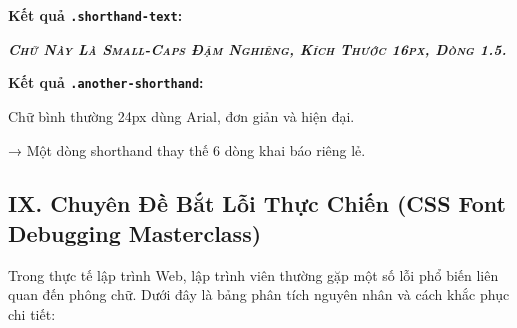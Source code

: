 \documentclass[11pt,oneside]{book}
\newcommand{\codeinline}[1]{\textcolor{accentOrange}{\texttt{#1}}}
\begin{document}
\begin{browserWindow}
\begin{tcolorbox}[arc=4pt, colback=white, colframe=primaryBlue!30, boxrule=0.8pt, top=10pt, bottom=10pt, left=12pt, right=12pt]
  {\sffamily\bfseries\color{primaryBlue} Kết quả \codeinline{.shorthand-text}:}\par\vspace{4pt}
  {\rmfamily\itshape\bfseries\fontsize{13}{20}\selectfont\textsc{Chữ Này Là Small-Caps Đậm Nghiêng, Kích Thước 16px, Dòng 1.5.}}\par\vspace{8pt}
  {\sffamily\bfseries\color{primaryBlue} Kết quả \codeinline{.another-shorthand}:}\par\vspace{4pt}
  {\sffamily\fontsize{16}{20}\selectfont Chữ bình thường 24px dùng Arial, đơn giản và hiện đại.}\par\vspace{4pt}
  {\sffamily\small\color{gray!70} → Một dòng shorthand thay thế 6 dòng khai báo riêng lẻ.}
\end{tcolorbox}
\end{browserWindow}


\subsection*{IX. Chuyên Đề Bắt Lỗi Thực Chiến (CSS Font Debugging Masterclass)}

Trong thực tế lập trình Web, lập trình viên thường gặp một số lỗi phổ biến liên quan đến phông chữ. Dưới đây là bảng phân tích nguyên nhân và cách khắc phục chi tiết:
\end{document}
